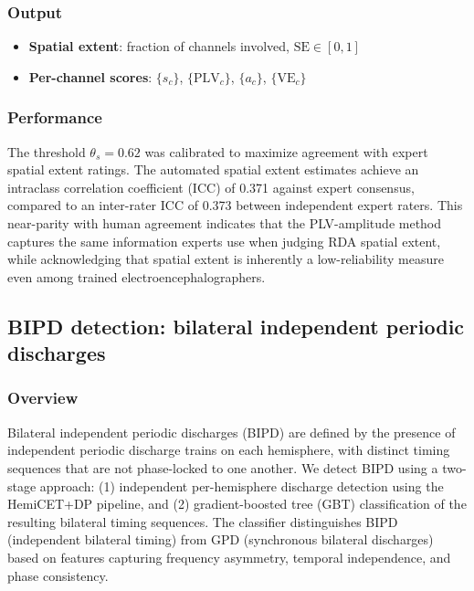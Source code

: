 \subsubsection{Output}

\begin{itemize}
  \item \textbf{Spatial extent}: fraction of channels involved, $\mathrm{SE} \in [0, 1]$
  \item \textbf{Per-channel scores}: $\{s_c\}$, $\{\mathrm{PLV}_c\}$, $\{a_c\}$, $\{\mathrm{VE}_c\}$
\end{itemize}

\subsubsection{Performance}

The threshold $\theta_s = 0.62$ was calibrated to maximize agreement with expert spatial extent ratings. The automated spatial extent estimates achieve an intraclass correlation coefficient (ICC) of 0.371 against expert consensus, compared to an inter-rater ICC of 0.373 between independent expert raters. This near-parity with human agreement indicates that the PLV-amplitude method captures the same information experts use when judging RDA spatial extent, while acknowledging that spatial extent is inherently a low-reliability measure even among trained electroencephalographers.

\subsection{BIPD detection: bilateral independent periodic discharges}
\label{app:bipd}

\subsubsection{Overview}

Bilateral independent periodic discharges (BIPD) are defined by the presence of independent periodic discharge trains on each hemisphere, with distinct timing sequences that are not phase-locked to one another. We detect BIPD using a two-stage approach: (1) independent per-hemisphere discharge detection using the HemiCET+DP pipeline, and (2) gradient-boosted tree (GBT) classification of the resulting bilateral timing sequences. The classifier distinguishes BIPD (independent bilateral timing) from GPD (synchronous bilateral discharges) based on features capturing frequency asymmetry, temporal independence, and phase consistency.

